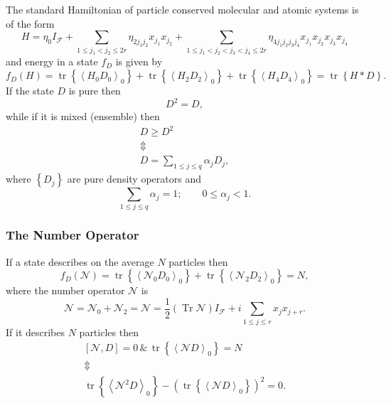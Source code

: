 \documentclass[aps,preprint]{revtex4}%
\begin{document}
The standard Hamiltonian of particle conserved molecular and atomic systems is
of the form
\begin{equation}
H=\eta_{0}I_{\mathcal{F}}+\sum_{1\leq j_{1}<j_{2}\leq2r}\eta_{2j_{1}j_{2}%
}x_{j_{1}}x_{j_{2}}+\sum_{1\leq j_{1}<j_{2}<j_{3}<j_{4}\leq2r}\eta
_{4j_{1}j_{2}j_{3}j_{4}}x_{j_{1}}x_{j_{2}}x_{j_{3}}x_{j_{4}}%
\end{equation}
and energy in a state $f_{D}$ is given by
\begin{equation}
f_{D}\left(  H\right)  =\operatorname*{tr}\left\{  \left\langle H_{0}%
D_{0}\right\rangle _{0}\right\}  +\operatorname*{tr}\left\{  \left\langle
H_{2}D_{2}\right\rangle _{0}\right\}  +\operatorname*{tr}\left\{  \left\langle
H_{4}D_{4}\right\rangle _{0}\right\}  =\operatorname*{tr}\left\{  H\ast
D\right\}  .
\end{equation}
If the state $D$ is pure then
\begin{equation}
D^{2}=D,
\end{equation}
while if it is mixed (ensemble) then
\begin{gather}
D\geq D^{2}\\
\Updownarrow\\
D=\sum_{1\leq j\leq q}\alpha_{j}D_{j},
\end{gather}
where $\left\{  D_{j}\right\}  $ are pure density operators and
\begin{equation}
\sum_{1\leq j\leq q}\alpha_{j}=1;\qquad0\leq\alpha_{j}<1.
\end{equation}


\subsubsection{The Number Operator}

If a state describes on the average $N$ particles then%
\begin{equation}
f_{D}\left(  \mathcal{N}\right)  =\operatorname*{tr}\left\{  \left\langle
\mathcal{N}_{0}D_{0}\right\rangle _{0}\right\}  +\operatorname*{tr}\left\{
\left\langle \mathcal{N}_{2}D_{2}\right\rangle _{0}\right\}  =N,
\end{equation}
where the number operator $\mathcal{N}$ is
\begin{equation}
\mathcal{N=N}_{0}+\mathcal{N}_{2}=\mathcal{N}=\frac{1}{2}\left(
\operatorname*{Tr}\mathcal{N}\right)  I_{\mathcal{F}}+i\sum_{1\leq j\leq
r}x_{j}x_{j+r}.
\end{equation}
If it describes $N$ particles then
\begin{gather}
\left[  \mathcal{N},D\right]  =0\,\&\,\operatorname*{tr}\left\{  \left\langle
\mathcal{N}D\right\rangle _{0}\right\}  =N\nonumber\\
\Updownarrow\nonumber\\
\operatorname*{tr}\left\{  \left\langle \mathcal{N}^{2}D\right\rangle
_{0}\right\}  -\left(  \operatorname*{tr}\left\{  \left\langle \mathcal{N}%
D\right\rangle _{0}\right\}  \right)  ^{2}=0.
\end{gather}
\end{document}
